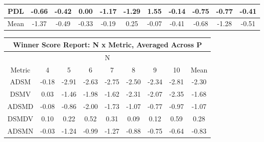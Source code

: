 \documentclass[11pt,a4paper]{report}
\begin{document}
\begin{longtable}{ | c || c | c | c | c | c | c | c | c | c || c |}
PDL &  \cellcolor[HTML]{FFEFEF} -0.66 &  \cellcolor[HTML]{FFF7F7} -0.42 &  \cellcolor[HTML]{FFFFFF} 0.00 &  \cellcolor[HTML]{FFDFDF} -1.17 &  \cellcolor[HTML]{FFDFDF} -1.29 &  \cellcolor[HTML]{D7D7FF} 1.55 &  \cellcolor[HTML]{FFFFFF} -0.14 &  \cellcolor[HTML]{FFEFEF} -0.75 &  \cellcolor[HTML]{FFEFEF} -0.77 &  \cellcolor[HTML]{FFF7F7} -0.41 \\
\hline
\hline
Mean  &  \cellcolor[HTML]{FFDFDF} -1.37 &  \cellcolor[HTML]{FFEFEF} -0.49 &  \cellcolor[HTML]{FFF7F7} -0.33 &  \cellcolor[HTML]{FFF7F7} -0.19 &  \cellcolor[HTML]{F7F7FF} 0.25 &  \cellcolor[HTML]{FFFFFF} -0.07 &  \cellcolor[HTML]{FFF7F7} -0.41 &  \cellcolor[HTML]{FFEFEF} -0.68 &  \cellcolor[HTML]{FFDFDF} -1.28 &  \cellcolor[HTML]{FFEFEF} -0.51 \\
\hline
\end{longtable}
\begin{longtable}{ | c || c | c | c | c | c | c | c || c |}
\hline
\multicolumn{9}{|c|}{ Winner Score Report: N x Metric, Averaged Across P } \\
\hline
\multicolumn{9}{|c|}{ N } \\
\hline
Metric & 4 & 5 & 6 & 7 & 8 & 9 & 10 & Mean\\
\hline
\hline
\endhead
ADSM &  \cellcolor[HTML]{FFF7F7} -0.18 &  \cellcolor[HTML]{FFB7B7} -2.91 &  \cellcolor[HTML]{FFBFBF} -2.63 &  \cellcolor[HTML]{FFB7B7} -2.75 &  \cellcolor[HTML]{FFBFBF} -2.50 &  \cellcolor[HTML]{FFC7C7} -2.34 &  \cellcolor[HTML]{FFB7B7} -2.81 &  \cellcolor[HTML]{FFC7C7} -2.30 \\
DSMV &  \cellcolor[HTML]{FFFFFF} 0.03 &  \cellcolor[HTML]{FFD7D7} -1.46 &  \cellcolor[HTML]{FFCFCF} -1.98 &  \cellcolor[HTML]{FFD7D7} -1.62 &  \cellcolor[HTML]{FFC7C7} -2.31 &  \cellcolor[HTML]{FFC7C7} -2.07 &  \cellcolor[HTML]{FFC7C7} -2.35 &  \cellcolor[HTML]{FFD7D7} -1.68 \\
ADSMD &  \cellcolor[HTML]{FFFFFF} -0.08 &  \cellcolor[HTML]{FFE7E7} -0.86 &  \cellcolor[HTML]{FFCFCF} -2.00 &  \cellcolor[HTML]{FFD7D7} -1.73 &  \cellcolor[HTML]{FFE7E7} -1.07 &  \cellcolor[HTML]{FFEFEF} -0.77 &  \cellcolor[HTML]{FFE7E7} -0.97 &  \cellcolor[HTML]{FFE7E7} -1.07 \\
DSMDV &  \cellcolor[HTML]{FFFFFF} 0.10 &  \cellcolor[HTML]{F7F7FF} 0.22 &  \cellcolor[HTML]{EFEFFF} 0.52 &  \cellcolor[HTML]{F7F7FF} 0.31 &  \cellcolor[HTML]{FFFFFF} 0.09 &  \cellcolor[HTML]{FFFFFF} 0.12 &  \cellcolor[HTML]{EFEFFF} 0.59 &  \cellcolor[HTML]{F7F7FF} 0.28 \\
ADSMN &  \cellcolor[HTML]{FFFFFF} -0.03 &  \cellcolor[HTML]{FFDFDF} -1.24 &  \cellcolor[HTML]{FFE7E7} -0.99 &  \cellcolor[HTML]{FFDFDF} -1.27 &  \cellcolor[HTML]{FFE7E7} -0.88 &  \cellcolor[HTML]{FFEFEF} -0.75 &  \cellcolor[HTML]{FFEFEF} -0.64 &  \cellcolor[HTML]{FFE7E7} -0.83 \\

\end{longtable}
\end{document}
